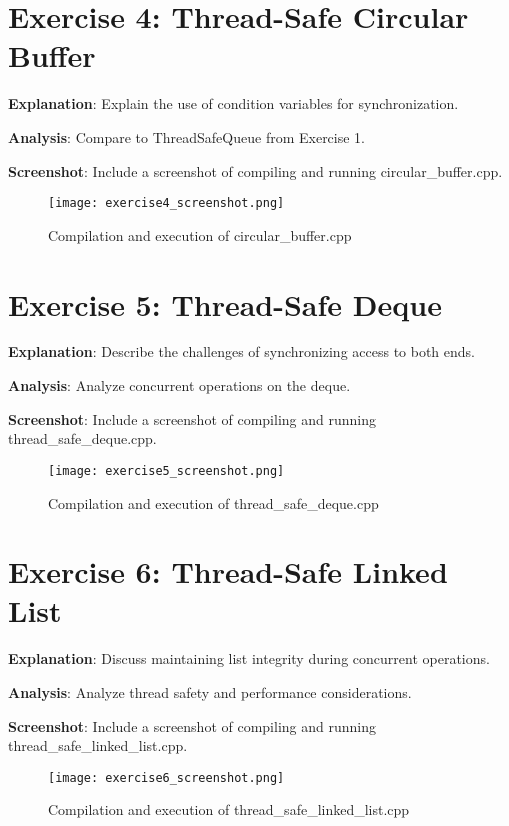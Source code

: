 \documentclass[a4paper,11pt]{article}
\begin{document}
\section{Exercise 4: Thread-Safe Circular Buffer}

\textbf{Explanation}: Explain the use of condition variables for synchronization.

\textbf{Analysis}: Compare to ThreadSafeQueue from Exercise 1.

\textbf{Screenshot}: Include a screenshot of compiling and running circular_buffer.cpp.
\begin{figure}[H]
    \centering
    \texttt{[image: exercise4\_screenshot.png]}
    \caption{Compilation and execution of circular_buffer.cpp}
\end{figure}

\section{Exercise 5: Thread-Safe Deque}

\textbf{Explanation}: Describe the challenges of synchronizing access to both ends.

\textbf{Analysis}: Analyze concurrent operations on the deque.

\textbf{Screenshot}: Include a screenshot of compiling and running thread_safe_deque.cpp.
\begin{figure}[H]
    \centering
    \texttt{[image: exercise5\_screenshot.png]}
    \caption{Compilation and execution of thread_safe_deque.cpp}
\end{figure}

\section{Exercise 6: Thread-Safe Linked List}

\textbf{Explanation}: Discuss maintaining list integrity during concurrent operations.

\textbf{Analysis}: Analyze thread safety and performance considerations.

\textbf{Screenshot}: Include a screenshot of compiling and running thread_safe_linked_list.cpp.
\begin{figure}[H]
    \centering
    \texttt{[image: exercise6\_screenshot.png]}
    \caption{Compilation and execution of thread_safe_linked_list.cpp}
\end{figure}
\end{document}
